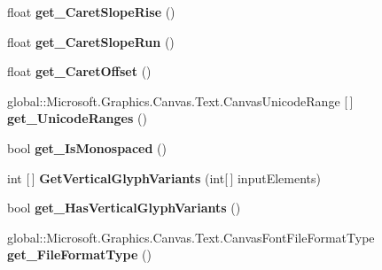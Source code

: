 \begin{DoxyCompactItemize}
float {\bfseries get\+\_\+\+Caret\+Slope\+Rise} ()
\item 
\mbox{\label{interface_microsoft_1_1_graphics_1_1_canvas_1_1_text_1_1_i_canvas_font_face_a49aeb124fbec7a5988ab8303e083297f}} 
float {\bfseries get\+\_\+\+Caret\+Slope\+Run} ()
\item 
\mbox{\label{interface_microsoft_1_1_graphics_1_1_canvas_1_1_text_1_1_i_canvas_font_face_a0e9776e90c455486f21ab8fc00fe5e28}} 
float {\bfseries get\+\_\+\+Caret\+Offset} ()
\item 
\mbox{\label{interface_microsoft_1_1_graphics_1_1_canvas_1_1_text_1_1_i_canvas_font_face_a116af1ab6e266a4c51cf12d7531d3937}} 
global\+::\+Microsoft.\+Graphics.\+Canvas.\+Text.\+Canvas\+Unicode\+Range \mbox{[}$\,$\mbox{]} {\bfseries get\+\_\+\+Unicode\+Ranges} ()
\item 
\mbox{\label{interface_microsoft_1_1_graphics_1_1_canvas_1_1_text_1_1_i_canvas_font_face_a3a4a5906deaf935d359585881c5fdd7d}} 
bool {\bfseries get\+\_\+\+Is\+Monospaced} ()
\item 
\mbox{\label{interface_microsoft_1_1_graphics_1_1_canvas_1_1_text_1_1_i_canvas_font_face_a2d8c847478d0aca13f27f888d385fb7f}} 
int \mbox{[}$\,$\mbox{]} {\bfseries Get\+Vertical\+Glyph\+Variants} (int\mbox{[}$\,$\mbox{]} input\+Elements)
\item 
\mbox{\label{interface_microsoft_1_1_graphics_1_1_canvas_1_1_text_1_1_i_canvas_font_face_a5c31ca441c937524ed89350a58c6c8d7}} 
bool {\bfseries get\+\_\+\+Has\+Vertical\+Glyph\+Variants} ()
\item 
\mbox{\label{interface_microsoft_1_1_graphics_1_1_canvas_1_1_text_1_1_i_canvas_font_face_a153445cb33fee2e61a2f244f67cce0f4}} 
global\+::\+Microsoft.\+Graphics.\+Canvas.\+Text.\+Canvas\+Font\+File\+Format\+Type {\bfseries get\+\_\+\+File\+Format\+Type} ()

\end{DoxyCompactItemize}
